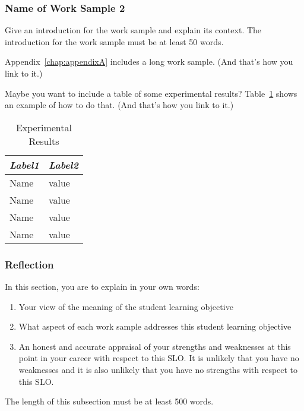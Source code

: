 \subsubsection{Name of Work Sample 2}
Give an introduction for the work sample and explain its context.  The
introduction for the work sample must be at least 50 words.

Appendix~\ref{chap:appendixA} includes a long work sample.  (And that's how you
link to it.)

Maybe you want to include a table of some experimental results?
Table~\ref{table:experimentalResults} shows an example of how to do that.
(And that's how you link to it.)

\begin{table}
\centering
\begin{tabular}{ll}
\textit{Label1} & \textit{Label2}\\
\hline \hline
Name            & value\\
Name            & value\\
Name            & value\\
Name            & value\\
\end{tabular}
\caption{Experimental Results}
\label{table:experimentalResults}
\end{table}

\subsubsection{Reflection}
In this section, you are to explain in your own words:
\begin{enumerate}
\item Your view of the meaning of the student learning objective
\item What aspect of each work sample addresses this student learning
      objective
\item An honest and accurate appraisal of your strengths and weaknesses at
      this point in your career with respect to this SLO.  It is unlikely
      that you have no weaknesses and it is also unlikely that you have no
      strengths with respect to this SLO.
\end{enumerate}

The length of this subsection must be at least 500 words.
